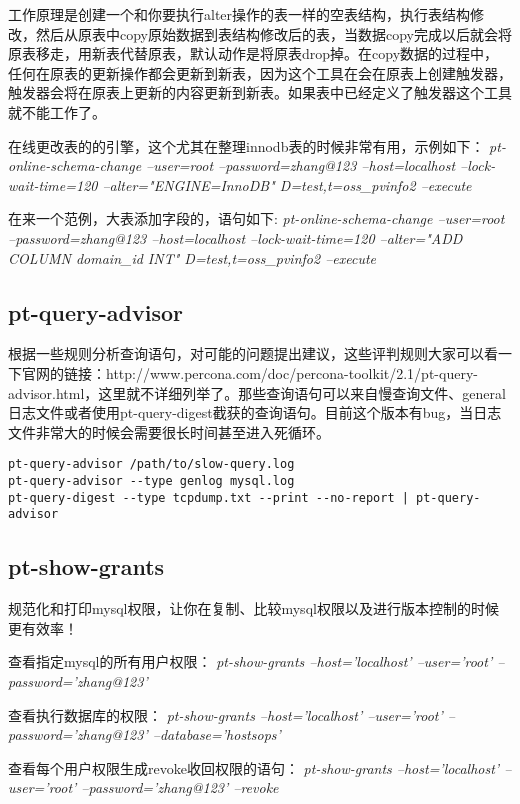 工作原理是创建一个和你要执行alter操作的表一样的空表结构，执行表结构修改，然后从原表中copy原始数据到表结构修改后的表，当数据copy完成以后就会将原表移走，用新表代替原表，默认动作是将原表drop掉。在copy数据的过程中，任何在原表的更新操作都会更新到新表，因为这个工具在会在原表上创建触发器，触发器会将在原表上更新的内容更新到新表。如果表中已经定义了触发器这个工具就不能工作了。

在线更改表的的引擎，这个尤其在整理innodb表的时候非常有用，示例如下：
\textit{pt-online-schema-change --user=root --password=zhang@123 --host=localhost --lock-wait-time=120 --alter="ENGINE=InnoDB" D=test,t=oss_pvinfo2 --execute}

在来一个范例，大表添加字段的，语句如下:
\textit{pt-online-schema-change --user=root --password=zhang@123 --host=localhost --lock-wait-time=120 --alter="ADD COLUMN domain_id INT" D=test,t=oss_pvinfo2 --execute}

\subsection{pt-query-advisor}

根据一些规则分析查询语句，对可能的问题提出建议，这些评判规则大家可以看一下官网的链接：http://www.percona.com/doc/percona-toolkit/2.1/pt-query-advisor.html，这里就不详细列举了。那些查询语句可以来自慢查询文件、general日志文件或者使用pt-query-digest截获的查询语句。目前这个版本有bug，当日志文件非常大的时候会需要很长时间甚至进入死循环。

\begin{lstlisting}
pt-query-advisor /path/to/slow-query.log
pt-query-advisor --type genlog mysql.log
pt-query-digest --type tcpdump.txt --print --no-report | pt-query-advisor
\end{lstlisting}
 
\subsection{pt-show-grants}

规范化和打印mysql权限，让你在复制、比较mysql权限以及进行版本控制的时候更有效率！

查看指定mysql的所有用户权限：
\textit{pt-show-grants --host='localhost' --user='root' --password='zhang@123'}

查看执行数据库的权限：
\textit{pt-show-grants --host='localhost' --user='root' --password='zhang@123' --database='hostsops'}

查看每个用户权限生成revoke收回权限的语句：
\textit{pt-show-grants --host='localhost' --user='root' --password='zhang@123' --revoke}
 
